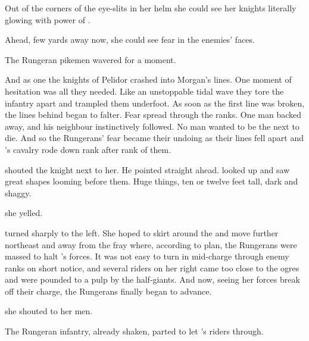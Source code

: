 Out of the corners of the eye-slits in her helm she could see her knights literally glowing with power of \iquin. 


Ahead, few yards away now, she could see fear in the enemies' faces. 


The Rungeran pikemen wavered for a moment. 

And as one the knights of Pelidor crashed into Morgan's lines. 
One moment of hesitation was all they needed. 
Like an unstoppable tidal wave they tore the infantry apart and trampled them underfoot. 
As soon as the first line was broken, the lines behind began to falter.
Fear spread through the ranks.
One man backed away, and his neighbour instinctively followed. 
No man wanted to be the next to die. 
And so the Rungerans' fear became their undoing as their lines fell apart and \Dornaer's cavalry rode down rank after rank of them. 


\ta{\Rah[\Dornaer]!} shouted the knight next to her.
He pointed straight ahead.
\Dornaer looked up and saw great shapes looming before them.
Huge things, ten or twelve feet tall, dark and shaggy.


 she yelled.

\Dornaer turned sharply to the left. 
She hoped to skirt around the \nephilim and move further northeast and away from the fray where, according to plan, the Rungerans were massed to halt \Kintaer's forces. 
It was not easy to turn in mid-charge through enemy ranks on short notice, and several riders on her right came too close to the ogres and were pounded to a pulp by the half-\human giants. 
And now, seeing her forces break off their charge, the Rungerans finally began to advance. 

 she shouted to her men.

The Rungeran infantry, already shaken, parted to let \Dornaer's riders through. 


